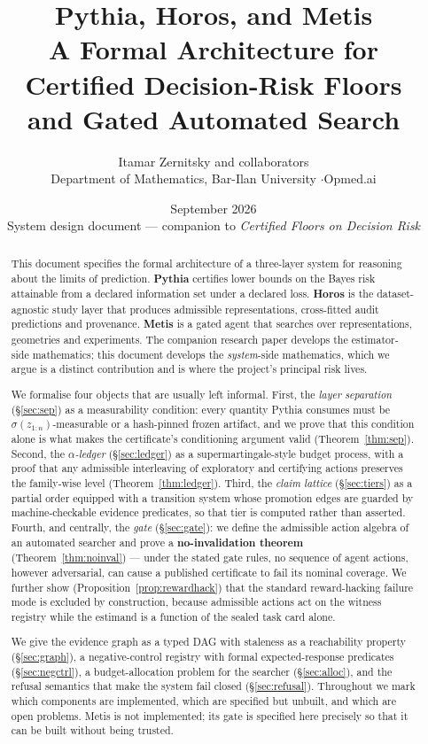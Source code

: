 \documentclass[11pt,a4paper]{article}
\title{\bfseries Pythia, Horos, and Metis\\[4pt]
\large A Formal Architecture for Certified Decision-Risk Floors\\ and Gated Automated Search}
\author{Itamar Zernitsky and collaborators\\
\small Department of Mathematics, Bar-Ilan University \quad$\cdot$\quad Opmed.ai}
\date{September 2026 \\[2pt] \small System design document --- companion to \emph{Certified Floors on Decision Risk}}
\theoremstyle{definition}
\theoremstyle{remark}
\begin{document}
\maketitle

\begin{abstract}
\noindent
This document specifies the formal architecture of a three-layer system for reasoning about the limits of prediction. \textbf{Pythia} certifies lower bounds on the Bayes risk attainable from a declared information set under a declared loss. \textbf{Horos} is the dataset-agnostic study layer that produces admissible representations, cross-fitted audit predictions and provenance. \textbf{Metis} is a gated agent that searches over representations, geometries and experiments. The companion research paper develops the estimator-side mathematics; this document develops the \emph{system}-side mathematics, which we argue is a distinct contribution and is where the project's principal risk lives.

We formalise four objects that are usually left informal. First, the \emph{layer separation} (\S\ref{sec:sep}) as a measurability condition: every quantity Pythia consumes must be $\sigma(z_{1:n})$-measurable or a hash-pinned frozen artifact, and we prove that this condition alone is what makes the certificate's conditioning argument valid (Theorem~\ref{thm:sep}). Second, the \emph{$\alpha$-ledger} (\S\ref{sec:ledger}) as a supermartingale-style budget process, with a proof that any admissible interleaving of exploratory and certifying actions preserves the family-wise level (Theorem~\ref{thm:ledger}). Third, the \emph{claim lattice} (\S\ref{sec:tiers}) as a partial order equipped with a transition system whose promotion edges are guarded by machine-checkable evidence predicates, so that tier is computed rather than asserted. Fourth, and centrally, the \emph{gate} (\S\ref{sec:gate}): we define the admissible action algebra of an automated searcher and prove a \textbf{no-invalidation theorem} (Theorem~\ref{thm:noinval}) --- under the stated gate rules, no sequence of agent actions, however adversarial, can cause a published certificate to fail its nominal coverage. We further show (Proposition~\ref{prop:rewardhack}) that the standard reward-hacking failure mode is excluded by construction, because admissible actions act on the witness registry while the estimand is a function of the sealed task card alone.

We give the evidence graph as a typed DAG with staleness as a reachability property (\S\ref{sec:graph}), a negative-control registry with formal expected-response predicates (\S\ref{sec:negctrl}), a budget-allocation problem for the searcher (\S\ref{sec:alloc}), and the refusal semantics that make the system fail closed (\S\ref{sec:refusal}). Throughout we mark which components are implemented, which are specified but unbuilt, and which are open problems. Metis is not implemented; its gate is specified here precisely so that it can be built without being trusted.
\end{abstract}
\end{document}
